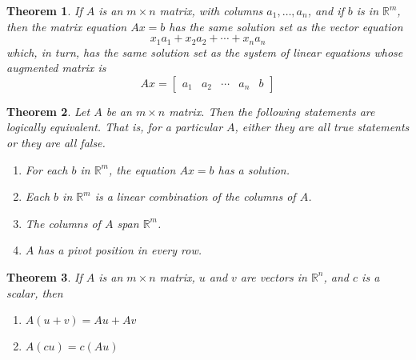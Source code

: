 \documentclass{article}
\newtheorem{theorem}{Theorem}
\begin{document}
\vspace{5mm}

\begin{theorem}
  If $A$ is an $m \times n$ matrix, with columns $a_1, \ldots, a_n$, and if $b$ is in $\mathbb{R}^m$, then the matrix equation $Ax = b$ has the same solution set as the vector equation
  \begin{equation*}
    x_1a_1 + x_2a_2 + \cdots + x_na_n
  \end{equation*}
  which, in turn, has the same solution set as the system of linear equations whose augmented matrix is 
  \begin{equation*}
    Ax = \begin{bmatrix}
      a_1 & a_2 & \cdots & a_n & b
    \end{bmatrix}
  \end{equation*}
\end{theorem}

\vspace{5mm}

\begin{theorem}
  Let $A$ be an $m \times n$ matrix. Then the following statements are logically equivalent. That is, for a particular $A$, either they are all true statements or they are all false.
  \begin{enumerate}[label=\alph*.)]
    \item For each $b$ in $\mathbb{R}^m$, the equation $Ax = b$ has a solution.
    \item Each $b$ in $\mathbb{R}^m$ is a linear combination of the columns of $A$.
    \item The columns of $A$ span $\mathbb{R}^m$.
    \item $A$ has a pivot position in every row.
  \end{enumerate}
\end{theorem}

\vspace{5mm}

\begin{theorem}
  If $A$ is an $m \times n$ matrix, $u$ and $v$ are vectors in $\mathbb{R}^n$, and $c$ is a scalar, then 
  \begin{enumerate}[label=\alph*.)]
    \item $A(u + v) = Au + Av$
    \item $A(cu) = c(Au)$
  \end{enumerate}
\end{theorem}

\pagebreak
\end{document}
